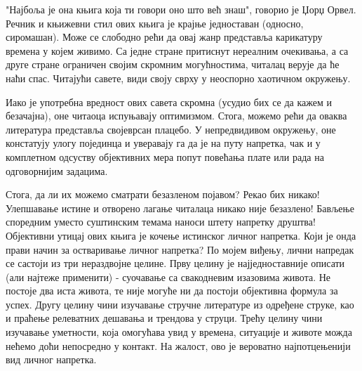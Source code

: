 \documentclass[b5paper]{article}
\begin{document}
"Најбоља је она књига која ти говори оно што већ знаш", говорио је Џорџ Орвел. Речник и књижевни стил ових књига је крајње једноставан (односно, сиромашан). Може се слободно рећи да овај жанр представља карикатуру времена у којем живимо. Са једне стране притиснут нереалним очекивања, а са друге стране ограничен својим скромним могућностима, читалац верује да ће наћи спас. Читајући савете, види своју сврху у неоспорно хаотичном окружењу.

Иако је употребна вредност ових савета скромна (усудио бих се да кажем и безачајна), оне читаоца испуњавају оптимизмом. Стога, можемо рећи да оваква литература представља својеврсан плацебо. У непредвидивом окружењу, оне констатују улогу појединца и уверавају га да је на путу напретка, чак и у комплетном одсуству објективних мера попут повећања плате или рада на одговорнијим задацима.

Стога, да ли их можемо сматрати безазленом појавом? Рекао бих никако! Улепшавање истине и отворено лагање читалаца никако није безазлено! Бављење споредним уместо суштинским темама наноси штету напретку друштва! Објективни утицај ових књига је кочење истинског личног напретка. Који је онда прави начин за остваривање личног напретка? По мојем виђењу, лични напредак се састоји из три нераздвојне целине. Прву целину је најједноставније описати (али најтеже применити) - суочавање са свакодневим изазовима живота. Не постоје два иста живота, те није могуће ни да постоји објективна формула за успех. Другу целину чини изучавање стручне литературе из одређене струке, као и праћење релеватних дешавања и трендова у струци. Трећу целину чини изучавање уметности, која омогућава увид у времена, ситуације и животе можда нећемо доћи непосредно у контакт. На жалост, ово је вероватно најпотцењенији вид личног напретка.
\end{document}
